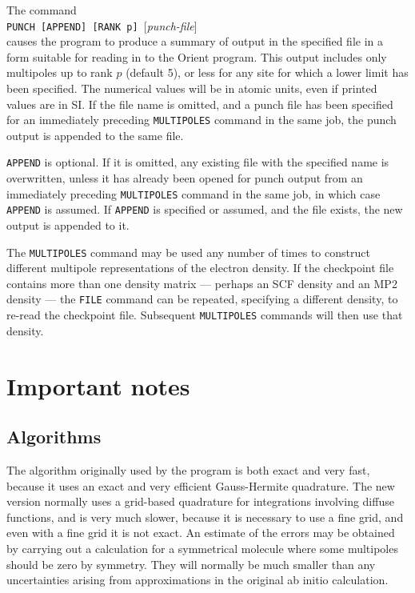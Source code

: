 \documentclass[12pt,txfonts]{paper}
\let\cite=\citep
\begin{document}
The command\\
\hspace*{2 em}\verb/PUNCH [APPEND] [RANK p] /[\emph{punch-file}]\\
causes the program to produce a summary of output in the specified
file in a form suitable for reading in to the Orient
program\cite{Orient5.0}. This output includes only multipoles up to
rank $p$ (default 5), or less for any site for which a lower limit has
been specified. The numerical 
values will be in atomic units, even if printed values are in SI. If
the file name is omitted, and a punch file has been specified for an
immediately preceding \verb/MULTIPOLES/ command in the same job, the
punch output is appended to the same file.

\verb/APPEND/ is optional. If it is omitted, any existing file with
the specified name is overwritten, unless it has already been opened
for punch output from an immediately preceding \verb/MULTIPOLES/
command in the same job, in which case \verb/APPEND/ is assumed. If
\verb/APPEND/ is specified or assumed, and the file exists, the new
output is appended to it.

The \verb/MULTIPOLES/ command may be used any number of times to
construct different multipole representations of the electron density.
If the checkpoint file contains more than one density matrix ---
perhaps an SCF density and an MP2 density --- the \verb/FILE/ command can be
repeated, specifying a different density, to re-read the checkpoint
file. Subsequent \verb/MULTIPOLES/ commands will then use that density.

\section{Important notes}

\subsection{Algorithms}

The algorithm originally used by the program is both exact and very fast,
because it uses an exact and very efficient Gauss-Hermite quadrature. 
The new version normally uses a grid-based quadrature for integrations
involving diffuse functions, and is very much slower, because it is
necessary to use a fine grid, and even with a fine grid it is not
exact. An estimate of the errors may be obtained by carrying out a
calculation for a symmetrical molecule where some multipoles should be
zero by symmetry. They will normally be much smaller than any
uncertainties arising from approximations in the original ab initio
calculation.
\end{document}
